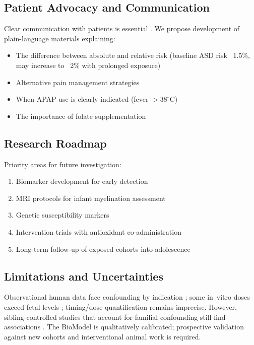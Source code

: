 \documentclass[12pt]{article}
\begin{document}
\subsection{Patient Advocacy and Communication}
Clear communication with patients is essential \citep{bauer2021}. We propose development of plain-language materials explaining:
\begin{itemize}
    \item The difference between absolute and relative risk (baseline ASD risk ~1.5\%, may increase to ~2\% with prolonged exposure) \citep{masarwa2018}
    \item Alternative pain management strategies
    \item When APAP use is clearly indicated (fever $>38^\circ$C)
    \item The importance of folate supplementation \citep{shaw2013}
\end{itemize}

\subsection{Research Roadmap}
Priority areas for future investigation:
\begin{enumerate}
    \item Biomarker development for early detection \citep{ji2020}
    \item MRI protocols for infant myelination assessment \citep{baker2020}
    \item Genetic susceptibility markers \citep{leppert2019,schultz2008}
    \item Intervention trials with antioxidant co-administration \citep{parker2020}
    \item Long-term follow-up of exposed cohorts into adolescence \citep{vlenterie2016}
\end{enumerate}

\subsection{Limitations and Uncertainties}
Observational human data face confounding by indication \citep{leppert2019}; some in~vitro doses exceed fetal levels \citep{perez2012}; timing/dose quantification remains imprecise. However, sibling-controlled studies that account for familial confounding still find associations \citep{brandlistuen2013,stergiakouli2016}. The BioModel is qualitatively calibrated; prospective validation against new cohorts and interventional animal work is required.
\end{document}
